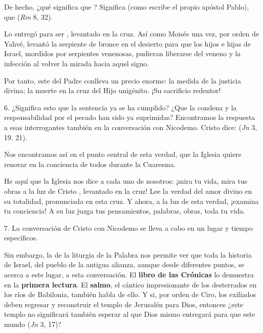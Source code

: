 \begin{body}
De hecho, ¿qué significa que ? Significa (como escribe el propio apóstol Pablo), que  (\textit{Rm} 8, 32).

Lo entregó para ser , levantado en la cruz. Así como Moisés una vez, por orden de Yahvé, levantó la serpiente de bronce en el desierto para que los hijos e hijas de Israel, mordidos por serpientes venenosas, pudieran liberarse del veneno y la infección al volver la mirada hacia aquel signo.

Por tanto, este  del Padre conlleva un precio enorme: la medida de la justicia divina; la muerte en la cruz del Hijo unigénito. ¡Su sacrificio redentor!

6. ¿Significa esto que la sentencia ya se ha cumplido? ¿Que la condena y la responsabilidad por el pecado han sido ya suprimidas? Encontramos la respuesta a esas interrogantes también en la conversación con Nicodemo. Cristo dice:  (\textit{Jn} 3, 19. 21).

Nos encontramos así en el punto central de esta verdad, que la Iglesia quiere renovar en la conciencia de todos durante la Cuaresma.

He aquí que la Iglesia nos dice a cada uno de nosotros: ¡mira tu vida, mira tus obras a la luz de Cristo , levantado en la cruz! Lee la verdad del amor divino en su totalidad, pronunciada en esta cruz. Y ahora, a la luz de esta verdad, ¡examina tu conciencia! A su luz juzga tus pensamientos, palabras, obras, toda tu vida.

7. La conversación de Cristo con Nicodemo se lleva a cabo en un lugar y tiempo específicos.

Sin embargo, la  de la liturgia de la Palabra nos permite ver que toda la historia de Israel, del pueblo de la antigua alianza, aunque desde diferentes puntos, se acerca a este lugar, a esta conversación. El \textbf{libro de las Crónicas} lo demuestra en la \textbf{primera lectura}. El \textbf{salmo}, el cántico impresionante de los desterrados en los ríos de Babilonia, también habla de ello. Y si, por orden de Ciro, los exiliados deben regresar y reconstruir el templo de Jerusalén para Dios, entonces ¿este templo no significará también esperar al que Dios mismo entregará para que este mundo  (\textit{Jn} 3, 17)?


\end{body}
